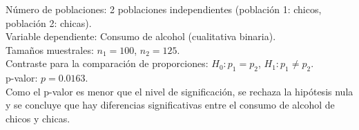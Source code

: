 \documentclass[
  a4paper,
]{scrreport}
\theoremstyle{definition}
\theoremstyle{remark}
\begin{document}
\begin{tcolorbox}[enhanced jigsaw, toprule=.15mm, breakable, opacityback=0, colback=white, coltitle=black, colbacktitle=quarto-callout-tip-color!10!white, toptitle=1mm, rightrule=.15mm, opacitybacktitle=0.6, leftrule=.75mm, colframe=quarto-callout-tip-color-frame, left=2mm, bottomtitle=1mm, titlerule=0mm, title=\textcolor{quarto-callout-tip-color}{\faLightbulb}\hspace{0.5em}{Solución}, arc=.35mm, bottomrule=.15mm]

Número de poblaciones: 2 poblaciones independientes (población 1:
chicos, población 2: chicas).\\
Variable dependiente: Consumo de alcohol (cualitativa binaria).\\
Tamaños muestrales: \(n_1=100\), \(n_2=125\).\\
Contraste para la comparación de proporciones: \(H_0:p_1=p_2\),
\(H_1:p_1\neq p_2\).\\
p-valor: \(p=0.0163\).\\
Como el p-valor es menor que el nivel de significación, se rechaza la
hipótesis nula y se concluye que hay diferencias significativas entre el
consumo de alcohol de chicos y chicas.

\end{tcolorbox}
\end{document}
